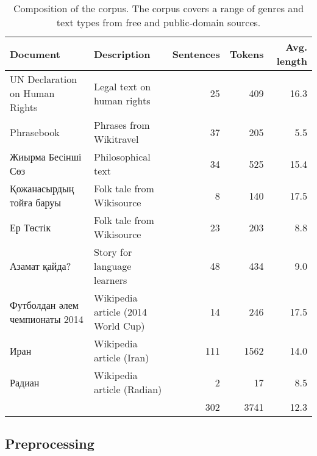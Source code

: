 \documentclass[a4paper,11pt, onecolumn,twoside]{article}
\begin{document}
\begin{table}[htbp]
  \centering
  \caption{Composition of the corpus. The corpus covers a range of genres and text types from free and public-domain sources.}
  \label{table:corpcomp}
	\begin{small}
		\begin{tabular}{llrrr}
			\toprule
				\textbf{Document} & \textbf{Description} & \textbf{Sentences} & \textbf{Tokens} & \textbf{Avg. length}\\
			\midrule
				UN Declaration on Human Rights & Legal text on human rights & 25 & 409 & 16.3 \\
				Phrasebook                     & Phrases from Wikitravel   & 37 & 205 & 5.5 \\
				Жиырма Бесінші Сөз             & Philosophical text        & 34 & 525 & 15.4 \\ 
				Қожанасырдың тойға баруы       & Folk tale from Wikisource  & 8 & 140 & 17.5 \\
				Ер Төстік                      & Folk tale from Wikisource  & 23 & 203 & 8.8 \\
				Азамат қайда?                  & Story for language learners & 48 & 434 & 9.0 \\
				Футболдан әлем чемпионаты 2014 & Wikipedia article (2014 World Cup) & 14 & 246 & 17.5 \\
				Иран & Wikipedia article (Iran)                                & 111 & 1562 & 14.0 \\
				Радиан & Wikipedia article (Radian)                            & 2 & 17 & 8.5 \\
			\midrule
			\multicolumn{2}{c}{~} & 302 & 3741 & 12.3 \\\cmidrule[\heavyrulewidth]{3-5}
		\end{tabular}
	\end{small}
\end{table}


\subsection{Preprocessing}

\end{document}
